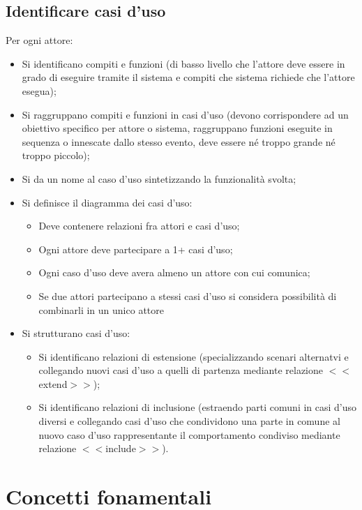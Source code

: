 \documentclass{article}
\begin{document}
    \subsection{Identificare casi d'uso}
      Per ogni attore:
      \begin{itemize}
        \item Si identificano compiti e funzioni (di basso livello che l'attore deve essere in grado di eseguire tramite il sistema e compiti che sistema richiede che l'attore esegua); 
        \item Si raggruppano compiti e funzioni in casi d'uso (devono corrispondere ad un obiettivo specifico per attore o sistema, raggruppano funzioni eseguite in sequenza o innescate dallo stesso evento, deve essere né troppo grande né troppo piccolo); 
        \item Si da un nome al caso d'uso sintetizzando la funzionalità svolta; 
        \item Si definisce il diagramma dei casi d'uso:
          \begin{itemize}
            \item Deve contenere relazioni fra attori e casi d'uso; 
            \item Ogni attore deve partecipare a 1+ casi d'uso;
            \item Ogni caso d'uso deve avera almeno un attore con cui comunica;
            \item Se due attori partecipano a stessi casi d'uso si considera possibilità di combinarli in un unico attore
          \end{itemize}
        \item Si strutturano casi d'uso:
          \begin{itemize}
            \item Si identificano relazioni di estensione (specializzando scenari alternatvi e collegando nuovi casi d'uso a quelli di partenza mediante relazione $<<$extend$>>$);
            \item Si identificano relazioni di inclusione (estraendo parti comuni in casi d'uso diversi e collegando casi d'uso che condividono una parte in comune al nuovo caso d'uso rappresentante il comportamento condiviso mediante relazione $<<$include$>>$).
          \end{itemize}
      \end{itemize}
  \section{Concetti fonamentali}
\end{document}
